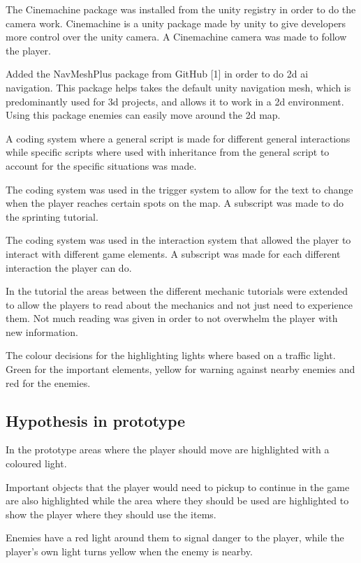 \documentclass{article}
\begin{document}
The Cinemachine package was installed from the unity registry in order to do the camera work. Cinemachine
is a unity package made by unity to give developers more control over the unity camera. A
Cinemachine camera was made to follow the player.

Added the NavMeshPlus package from GitHub [1] in order to do 2d ai navigation.
This package helps takes the default unity navigation mesh, which is predominantly used for 3d projects, and allows it
to work in a 2d environment. Using this package enemies can easily move around the 2d map.

A coding system where a general script is made for different general interactions while specific scripts
where used with inheritance from the general script to account for the specific situations was made. 

The coding system was used in the trigger system to allow for the text to change when the player
reaches certain spots on the map. A subscript was made to do the sprinting tutorial.

The coding system was used in the interaction system that allowed the player to interact with
different game elements. A subscript was made for each different interaction the player can do.

In the tutorial the areas between the different mechanic tutorials were extended to allow the players
to read about the mechanics and not just need to experience them. Not much reading was given in order
to not overwhelm the player with new information.

The colour decisions for the highlighting lights where based on a traffic light. Green for the important elements,
yellow for warning against nearby enemies and red for the enemies.



\subsection{Hypothesis in prototype}
In the prototype areas where the player should move are highlighted with
a coloured light. 

Important objects that the player would need to pickup
to continue in the game are also highlighted while the area where they should
be used are highlighted to show the player where they should use the items. 

Enemies have a red light around them to signal danger to the player, while the 
player's own light turns yellow when the enemy is nearby. 
\end{document}

